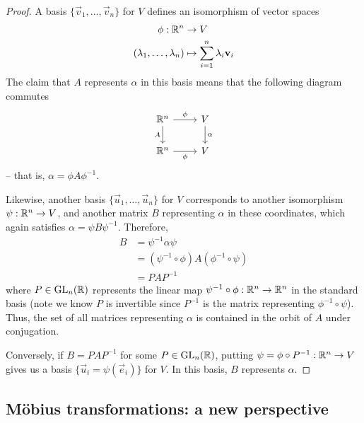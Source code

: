\documentclass{../template/note}
\begin{document}
    \begin{proof}
        A basis \(\{\vec v_1, \dots, \vec v_n\}\) for \(V\) defines an isomorphism of vector spaces
        \begin{align*}
            \phi: \RR^n &\to V \\
            (\lambda_1, \dots, \lambda_n) &\mapsto \sum_{i=1}^n \lambda_i \vec v_i
        \end{align*}
        The claim that \(A\) represents \(\alpha\) in this basis means that the following diagram commutes
        \[\begin{tikzcd}
            {\RR^n} & V \\
            {\RR^n} & V
            \arrow["\phi", from=1-1, to=1-2]
            \arrow["A"', from=1-1, to=2-1]
            \arrow["\alpha", from=1-2, to=2-2]
            \arrow["\phi"', from=2-1, to=2-2]
        \end{tikzcd}\]
        -- that is, \(\alpha = \phi A \phi^{-1}\).
        

        Likewise, another basis \(\{\vec u_1, \dots, \vec u_n\}\) for \(V\) corresponds to another isomorphism \(\psi: \mathbb R^n \to V\), and another matrix \(B\) representing \(\alpha\) in these coordinates, which again satisfies \(\alpha = \psi B \psi^{-1}\). Therefore,
        \begin{align*}
            B &= \psi^{-1}\alpha \psi \\
            &= (\psi^{-1} \circ \phi) A(\phi^{-1} \circ \psi) \\
            &= PAP^{-1}
        \end{align*}
        where \(P \in \operatorname{GL}_n(\mathbb R)\) represents the linear map \(\psi^{-1} \circ \phi: \mathbb R^n \to \mathbb R^n\) in the standard basis (note we know \(P\) is invertible since \(P^{-1}\) is the matrix representing \(\phi^{-1} \circ \psi\)). Thus, the set of all matrices representing \(\alpha\) is contained in the orbit of \(A\) under conjugation.

        Conversely, if \(B = PAP^{-1}\) for some \(P \in \operatorname{GL}_n(\mathbb R)\), putting \(\psi = \phi \circ P^{-1}: \mathbb R^n \to V\) gives us a basis \(\{\vec u_i = \psi(\vec e_i)\}\) for \(V\). In this basis, \(B\) represents \(\alpha\).
    \end{proof}

    \subsection{M\"obius transformations: a new perspective}
\end{document}
